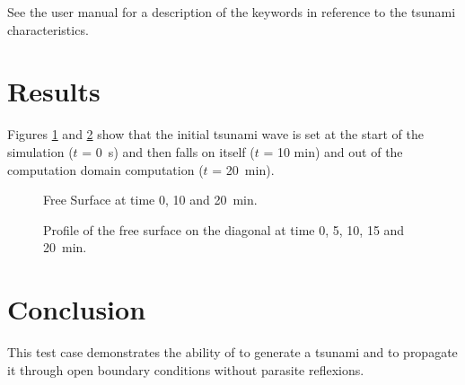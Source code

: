 See the  user manual for a description of the keywords in reference
to the tsunami characteristics.

\section{Results}
Figures \ref{fig:okada:Freesurface} and \ref{fig:okada:FreesurfaceProfile} show
that the initial tsunami wave is set at the start of the simulation ($t$ = 0~s)
and then falls on itself ($t$ = 10 min) and out of the computation domain
computation ($t$ = 20~min).

\begin{figure}
\centering
{}
\caption{Free Surface at time 0, 10 and 20~min.}\label{fig:okada:Freesurface}
\end{figure}

\begin{figure}
\centering
{}
\caption{Profile of the free surface on the diagonal at time 0, 5, 10, 15 and 20~min.}\label{fig:okada:FreesurfaceProfile}
\end{figure}

\section{Conclusion}
This test case demonstrates the ability of  to generate a tsunami
and to propagate it through open boundary conditions without parasite reflexions.
